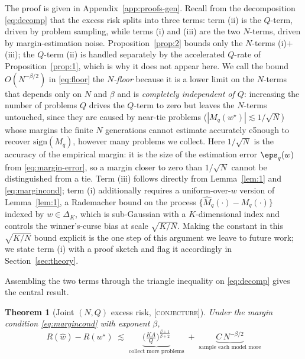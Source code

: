 \documentclass{article} %
\newtheorem{theorem}{Theorem}
\providecommand{\simplex}{\Delta_K}
\providecommand{\Risk}{R}
\providecommand{\Mhat}{\widehat{M}}
\providecommand{\what}{\widehat{w}}
\providecommand{\wstar}{w^{\star}}
\providecommand{\sign}{\mathrm{sign}}
\providecommand{\conjecture}{\textsc{[conjecture]}}
\providecommand{\conjecture}{}
\begin{document}
\noindent The proof is given in Appendix~\ref{app:proofs-gen}. Recall from the
decomposition \eqref{eq:decomp} that the excess risk splits into three terms:
term (ii) is the $Q$-term, driven by problem sampling, while terms (i) and (iii)
are the two $N$-terms, driven by margin-estimation noise. Proposition~\ref{prop:2}
bounds only the $N$-terms (i)$+$(iii); the $Q$-term (ii) is handled separately by
the accelerated $Q$-rate of Proposition~\ref{prop:1}, which is why it does not
appear here. We call the
bound $O(N^{-\beta/2})$ in \eqref{eq:floor} the \emph{$N$-floor} because it is a
lower limit on the $N$-terms that depends only on $N$ and $\beta$ and is
\emph{completely independent of $Q$}: increasing the number of problems $Q$
drives the $Q$-term to zero but leaves the $N$-terms untouched, since they are
caused by near-tie problems ($|M_q(\wstar)|\lesssim 1/\sqrt N$) whose margins the
finite $N$ generations cannot estimate accurately e5nough to recover $\sign(M_q)$,
however many problems we collect. Here $1/\sqrt N$ is the accuracy of the
empirical margin: it is the size of the estimation error $\eps_q(w)$ from
\eqref{eq:margin-error}, so a margin closer to zero than $1/\sqrt N$ cannot be
distinguished from a tie. Term (iii) follows directly from Lemma~\ref{lem:1} and
\eqref{eq:margincond}; term (i) additionally requires a uniform-over-$w$ version
of Lemma~\ref{lem:1}, a Rademacher bound on the process
$\{\Mhat_q(\cdot)-M_q(\cdot)\}$ indexed by $w\in\simplex$, which is sub-Gaussian
with a $K$-dimensional index and controls the winner's-curse bias at scale
$\sqrt{K/N}$. Making the constant in this $\sqrt{K/N}$ bound explicit is the one
step of this argument we leave to future work; we state term (i) with a proof
sketch and flag it accordingly in Section~\ref{sec:theory}.

Assembling the two terms through the triangle inequality on
\eqref{eq:decomp} gives the central result.

\begin{theorem}[Joint $(N,Q)$ excess risk, \conjecture]
\label{thm:main}
Under the margin condition \eqref{eq:margincond} with exponent $\beta$,
\begin{equation}
\label{eq:joint}
\boxed{\;
\Risk(\what) - \Risk(\wstar)
\;\lesssim\;
\underbrace{\Big(\tfrac{KA}{Q}\Big)^{\frac{\beta+1}{\beta+2}}}_{\text{collect more problems}}
\;+\;
\underbrace{C\,N^{-\beta/2}}_{\text{sample each model more}}
\;}
\end{equation}
\end{theorem}
\end{document}
